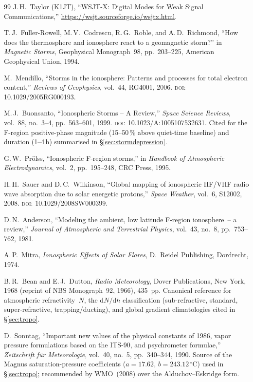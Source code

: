 \documentclass[11pt,a4paper]{article}
\begin{document}
\begin{thebibliography}{99}
  J.\,H.~Taylor (K1JT),
  ``WSJT-X: Digital Modes for Weak Signal Communications,''
  \url{https://wsjt.sourceforge.io/wsjtx.html}.

  T.\,J.~Fuller-Rowell, M.\,V.~Codrescu, R.\,G.~Roble, and
  A.\,D.~Richmond,
  ``How does the thermosphere and ionosphere react to a geomagnetic
  storm?''
  in \emph{Magnetic Storms}, Geophysical Monograph~98, pp.~203--225,
  American Geophysical Union, 1994.

  M.~Mendillo,
  ``Storms in the ionosphere: Patterns and processes for total
  electron content,''
  \emph{Reviews of Geophysics}, vol.~44, RG4001, 2006.
  \textsc{doi}: 10.1029/2005RG000193.

  M.\,J.~Buonsanto,
  ``Ionospheric Storms -- A Review,''
  \emph{Space Science Reviews}, vol.~88, no.~3--4,
  pp.~563--601, 1999.
  \textsc{doi}: 10.1023/A:1005107532631.
  Cited for the F-region positive-phase magnitude
  (15--50\,\% above quiet-time baseline) and duration
  (1--4\,h) summarised in \S\ref{sec:stormdepression}.

  G.\,W.~Pr\"olss,
  ``Ionospheric F-region storms,''
  in \emph{Handbook of Atmospheric Electrodynamics}, vol.~2,
  pp.~195--248, CRC Press, 1995.

  H.\,H.~Sauer and D.\,C.~Wilkinson,
  ``Global mapping of ionospheric HF/VHF radio wave absorption due to
  solar energetic protons,''
  \emph{Space Weather}, vol.~6, S12002, 2008.
  \textsc{doi}: 10.1029/2008SW000399.

  D.\,N.~Anderson,
  ``Modeling the ambient, low latitude F-region ionosphere~--
  a review,''
  \emph{Journal of Atmospheric and Terrestrial Physics},
  vol.~43, no.~8, pp.~753--762, 1981.

  A.\,P.~Mitra,
  \emph{Ionospheric Effects of Solar Flares},
  D.~Reidel Publishing, Dordrecht, 1974.

  B.\,R.~Bean and E.\,J.~Dutton,
  \emph{Radio Meteorology},
  Dover Publications, New York, 1968 (reprint of NBS Monograph~92,
  1966), 435~pp.
  Canonical reference for atmospheric refractivity~$N$, the
  $\mathrm{d}N/\mathrm{d}h$ classification (sub-refractive,
  standard, super-refractive, trapping/ducting), and global
  gradient climatologies cited in \S\ref{sec:tropo}.

  D.~Sonntag,
  ``Important new values of the physical constants of 1986,
  vapor pressure formulations based on the ITS-90, and psychrometer
  formulae,''
  \emph{Zeitschrift f\"ur Meteorologie}, vol.~40, no.~5,
  pp.~340--344, 1990.
  Source of the Magnus saturation-pressure coefficients
  ($a=17.62$, $b=243.12\,^\circ$C) used in \S\ref{sec:tropo};
  recommended by WMO~(2008) over the Alduchov--Eskridge form.


\end{thebibliography}
\end{document}
